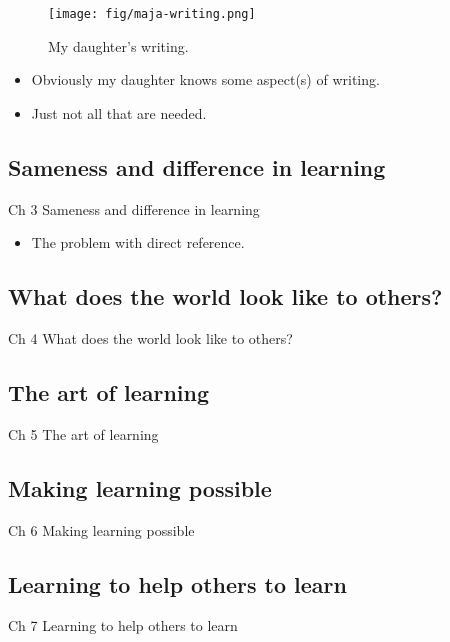 \begin{frame}
  \begin{figure}
    \texttt{[image: fig/maja-writing.png]}
    \caption{My daughter's writing.}
  \end{figure}
  \begin{example}
    \begin{itemize}
      \item Obviously my daughter knows some aspect(s) of writing.
      \item Just not all that are needed.
    \end{itemize}
  \end{example}
\end{frame}

\subsection{Sameness and difference in learning}

\begin{frame}
  \begin{block}{Ch 3 Sameness and difference in learning}
    \begin{itemize}
      \item The problem with direct reference.
    \end{itemize}
  \end{block}
\end{frame}

\subsection{What does the world look like to others?}

\begin{frame}
  \begin{block}{Ch 4 What does the world look like to others?}
  \end{block}
\end{frame}

\subsection{The art of learning}

\begin{frame}
  \begin{block}{Ch 5 The art of learning}
  \end{block}
\end{frame}

\subsection{Making learning possible}

\begin{frame}
  \begin{block}{Ch 6 Making learning possible}
  \end{block}
\end{frame}

\subsection{Learning to help others to learn}

\begin{frame}
  \begin{block}{Ch 7 Learning to help others to learn}
  \end{block}
\end{frame}
